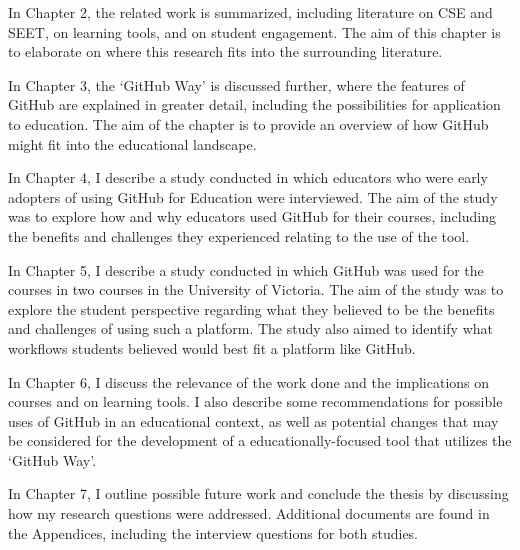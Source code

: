 In Chapter 2, the related work is summarized, including literature on CSE and SEET, on learning tools, and on student engagement. The aim of this chapter is to elaborate on where this research fits into the surrounding literature.

In Chapter 3, the `GitHub Way' is discussed further, where the features of GitHub are explained in greater detail, including the possibilities for application to education. The aim of the chapter is to provide an overview of how GitHub might fit into the educational landscape.

In Chapter 4, I describe a study conducted in which educators who were early adopters of using GitHub for Education were interviewed. The aim of the study was to explore how and why educators used GitHub for their courses, including the benefits and challenges they experienced relating to the use of the tool.

In Chapter 5, I describe a study conducted in which GitHub was used for the courses in two courses in the University of Victoria. The aim of the study was to explore the student perspective regarding what they believed to be the benefits and challenges of using such a platform. The study also aimed to identify what workflows students believed would best fit a platform like GitHub.

In Chapter 6, I discuss the relevance of the work done and the implications on courses and on learning tools. I also describe some recommendations for possible uses of GitHub in an educational context, as well as potential changes that may be considered for the development of a educationally-focused tool that utilizes the `GitHub Way'.

In Chapter 7, I outline possible future work and conclude the thesis by discussing how my research questions were addressed. Additional documents are found in the Appendices, including the interview questions for both studies.



